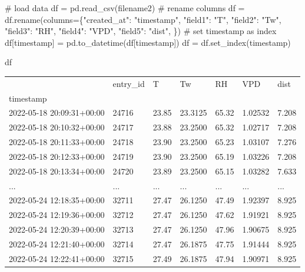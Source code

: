 \documentclass[
  letterpaper,
  DIV=11,
  numbers=noendperiod,
  oneside]{scrreprt}
\newenvironment{Shaded}{\begin{snugshade}}{\end{snugshade}}
\newcommand{\CommentTok}[1]{\textcolor[rgb]{0.37,0.37,0.37}{#1}}
\newcommand{\NormalTok}[1]{\textcolor[rgb]{0.00,0.23,0.31}{#1}}
\newcommand{\OperatorTok}[1]{\textcolor[rgb]{0.37,0.37,0.37}{#1}}
\newcommand{\StringTok}[1]{\textcolor[rgb]{0.13,0.47,0.30}{#1}}
\begin{document}
\begin{Shaded}
\begin{Highlighting}[]
\CommentTok{\# load data}
\NormalTok{df }\OperatorTok{=}\NormalTok{ pd.read\_csv(filename2)}
\CommentTok{\# rename columns}
\NormalTok{df }\OperatorTok{=}\NormalTok{ df.rename(columns}\OperatorTok{=}\NormalTok{\{}\StringTok{"created\_at"}\NormalTok{: }\StringTok{"timestamp"}\NormalTok{,}
                        \StringTok{"field1"}\NormalTok{: }\StringTok{"T"}\NormalTok{,}
                        \StringTok{"field2"}\NormalTok{: }\StringTok{"Tw"}\NormalTok{,}
                        \StringTok{"field3"}\NormalTok{: }\StringTok{"RH"}\NormalTok{,}
                        \StringTok{"field4"}\NormalTok{: }\StringTok{"VPD"}\NormalTok{,}
                        \StringTok{"field5"}\NormalTok{: }\StringTok{"dist"}\NormalTok{,}
\NormalTok{                        \})}
\CommentTok{\# set timestamp as index}
\NormalTok{df[}\StringTok{\textquotesingle{}timestamp\textquotesingle{}}\NormalTok{] }\OperatorTok{=}\NormalTok{ pd.to\_datetime(df[}\StringTok{\textquotesingle{}timestamp\textquotesingle{}}\NormalTok{])}
\NormalTok{df }\OperatorTok{=}\NormalTok{ df.set\_index(}\StringTok{\textquotesingle{}timestamp\textquotesingle{}}\NormalTok{)}
\end{Highlighting}
\end{Shaded}

\begin{Shaded}
\begin{Highlighting}[]
\NormalTok{df}
\end{Highlighting}
\end{Shaded}

\begin{longtable}[]{@{}lllllll@{}}
\toprule()
& entry\_id & T & Tw & RH & VPD & dist \\
timestamp & & & & & & \\
\midrule()
\endhead
2022-05-18 20:09:31+00:00 & 24716 & 23.85 & 23.3125 & 65.32 & 1.02532 &
7.208 \\
2022-05-18 20:10:32+00:00 & 24717 & 23.88 & 23.2500 & 65.32 & 1.02717 &
7.208 \\
2022-05-18 20:11:33+00:00 & 24718 & 23.90 & 23.2500 & 65.23 & 1.03107 &
7.276 \\
2022-05-18 20:12:33+00:00 & 24719 & 23.90 & 23.2500 & 65.19 & 1.03226 &
7.208 \\
2022-05-18 20:13:34+00:00 & 24720 & 23.89 & 23.2500 & 65.15 & 1.03282 &
7.633 \\
... & ... & ... & ... & ... & ... & ... \\
2022-05-24 12:18:35+00:00 & 32711 & 27.47 & 26.1250 & 47.49 & 1.92397 &
8.925 \\
2022-05-24 12:19:36+00:00 & 32712 & 27.47 & 26.1250 & 47.62 & 1.91921 &
8.925 \\
2022-05-24 12:20:39+00:00 & 32713 & 27.47 & 26.1250 & 47.96 & 1.90675 &
8.925 \\
2022-05-24 12:21:40+00:00 & 32714 & 27.47 & 26.1875 & 47.75 & 1.91444 &
8.925 \\
2022-05-24 12:22:41+00:00 & 32715 & 27.49 & 26.1875 & 47.94 & 1.90971 &
8.925 \\
\bottomrule()
\end{longtable}
\end{document}
